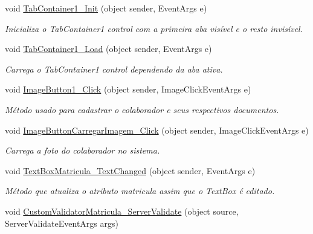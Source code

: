 \begin{DoxyCompactItemize}
\item 
void \hyperlink{class_sistema_r_h_1_1_cadastro_docs_abb84b296a44826a1ab2b3f2e9f0a82cc}{TabContainer1\_\-Init} (object sender, EventArgs e)
\begin{DoxyCompactList}\small\item\em Inicializa o TabContainer1 control com a primeira aba visível e o resto invisível. \item\end{DoxyCompactList}\item 
void \hyperlink{class_sistema_r_h_1_1_cadastro_docs_a3f3237b482a0bf7af3d4f73383fc0bae}{TabContainer1\_\-Load} (object sender, EventArgs e)
\begin{DoxyCompactList}\small\item\em Carrega o TabContainer1 control dependendo da aba ativa. \item\end{DoxyCompactList}\item 
void \hyperlink{class_sistema_r_h_1_1_cadastro_docs_a00fa4ed92fd55e137ebba40c622b0c81}{ImageButton1\_\-Click} (object sender, ImageClickEventArgs e)
\begin{DoxyCompactList}\small\item\em Método usado para cadastrar o colaborador e seus respectivos documentos. \item\end{DoxyCompactList}\item 
void \hyperlink{class_sistema_r_h_1_1_cadastro_docs_aab7beee6a524f5e16a069cdba2901fb7}{ImageButtonCarregarImagem\_\-Click} (object sender, ImageClickEventArgs e)
\begin{DoxyCompactList}\small\item\em Carrega a foto do colaborador no sistema. \item\end{DoxyCompactList}\item 
void \hyperlink{class_sistema_r_h_1_1_cadastro_docs_a77280c5675d3cfcdc500c3dd57c1119e}{TextBoxMatricula\_\-TextChanged} (object sender, EventArgs e)
\begin{DoxyCompactList}\small\item\em Método que atualiza o atributo matricula assim que o TextBox é editado. \item\end{DoxyCompactList}\item 
void \hyperlink{class_sistema_r_h_1_1_cadastro_docs_ab2a021a7394f0618da76a8ed2d3e48b7}{CustomValidatorMatricula\_\-ServerValidate} (object source, ServerValidateEventArgs args)

\end{DoxyCompactItemize}
